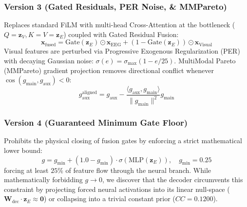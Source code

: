 \documentclass[journal,twocolumn]{IEEEtran}
\begin{document}
\subsubsection{Version 3 (Gated Residuals, PER Noise, \& MMPareto)}
Replaces standard FiLM with multi-head Cross-Attention at the bottleneck ($Q=\mathbf{z}_V, K=V=\mathbf{z}_E$) coupled with Gated Residual Fusion:
\begin{equation}
\mathbf{x}_{\text{fused}} = \text{Gate}(\mathbf{z}_E) \odot \mathbf{x}_{\text{EEG}} + (1 - \text{Gate}(\mathbf{z}_E)) \odot \mathbf{x}_{\text{Visual}}
\end{equation}
Visual features are perturbed via Progressive Exogenous Regularization (PER) with decaying Gaussian noise: $\sigma(e) = \sigma_{\max}(1 - e / 25)$. MultiModal Pareto (MMPareto) gradient projection removes directional conflict whenever $\cos(g_{\text{main}}, g_{\text{aux}}) < 0$:
\begin{equation}
g_{\text{aux}}^{\text{aligned}} = g_{\text{aux}} - \frac{\langle g_{\text{aux}}, g_{\text{main}} \rangle}{\|g_{\text{main}}\|^2} g_{\text{main}}
\end{equation}

\subsubsection{Version 4 (Guaranteed Minimum Gate Floor)}
Prohibits the physical closing of fusion gates by enforcing a strict mathematical lower bound:
\begin{equation}
g = g_{\min} + (1.0 - g_{\min}) \cdot \sigma(\text{MLP}(\mathbf{z}_E)), \quad g_{\min} = 0.25
\end{equation}
forcing at least $25\%$ of feature flow through the neural branch. While mathematically forbidding $g \to 0$, we discover that the decoder circumvents this constraint by projecting forced neural activations into its linear null-space ($\mathbf{W}_{\text{dec}} \cdot \mathbf{z}_E \approx \mathbf{0}$) or collapsing into a trivial constant prior ($CC = 0.1200$).
\end{document}
